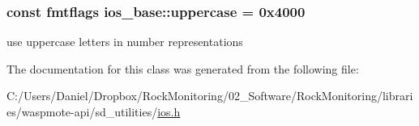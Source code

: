 \subsubsection[{\texorpdfstring{uppercase}{uppercase}}]{\setlength{\rightskip}{0pt plus 5cm}const {\bf fmtflags} ios\+\_\+base\+::uppercase = 0x4000\hspace{0.3cm}{\ttfamily [static]}}\hypertarget{classios__base_ade3db1fe3249e87f4c47a9a8916793d9}{}\label{classios__base_ade3db1fe3249e87f4c47a9a8916793d9}
use uppercase letters in number representations 

The documentation for this class was generated from the following file\+:\begin{DoxyCompactItemize}
\item 
C\+:/\+Users/\+Daniel/\+Dropbox/\+Rock\+Monitoring/02\+\_\+\+Software/\+Rock\+Monitoring/libraries/waspmote-\/api/sd\+\_\+utilities/\hyperlink{ios_8h}{ios.\+h}\end{DoxyCompactItemize}
